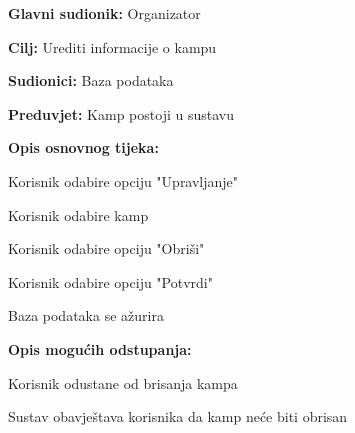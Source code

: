 					\noindent {}
					\begin{packed_item}
						
						\item \textbf{Glavni sudionik: } Organizator
						\item  \textbf{Cilj:} Urediti informacije o kampu
						\item  \textbf{Sudionici:} Baza podataka
						\item  \textbf{Preduvjet:} Kamp postoji u sustavu
						\item  \textbf{Opis osnovnog tijeka:}
						
						\item[] \begin{packed_enum}
							
							\item Korisnik odabire opciju "Upravljanje"
							\item Korisnik odabire kamp
							\item Korisnik odabire opciju "Obriši"
							\item Korisnik odabire opciju "Potvrdi"
							\item Baza podataka se ažurira
						\end{packed_enum}
						
						\item  \textbf{Opis mogućih odstupanja:}
						
						\item[] \begin{packed_item}
							
							\item[3.a] Korisnik odustane od brisanja kampa
							\item[] \begin{packed_enum}
								
								\item Sustav obavještava korisnika da kamp neće biti obrisan
								
							\end{packed_enum}
							
							
						\end{packed_item}
					
					\end{packed_item}
				

